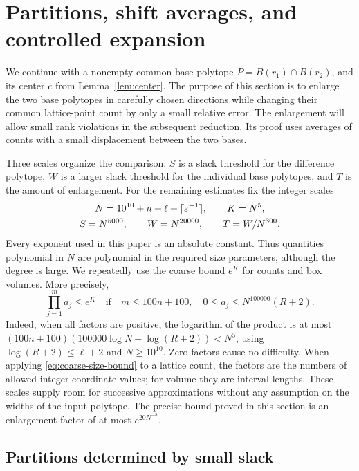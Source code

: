 \section{Partitions, shift averages, and controlled expansion}
\label{sec:geometry}

We continue with a nonempty common-base polytope
\(P=B(r_1)\cap B(r_2)\), and its center \(c\) from
Lemma~\ref{lem:center}.
The purpose of this section is to enlarge the two base polytopes in
carefully chosen directions while changing their common lattice-point
count by only a small relative error.  The enlargement will allow
small rank violations in the subsequent reduction.  Its proof uses
averages of counts with a small displacement between the two bases.

Three scales organize the comparison: \(S\) is a slack threshold for
the difference polytope, \(W\) is a larger slack threshold for the
individual base polytopes, and \(T\) is the amount of enlargement.
For the remaining estimates fix the integer scales
\begin{equation}\label{eq:scales}
 \begin{gathered}
 N=10^{10}+n+\ell+\lceil\varepsilon^{-1}\rceil,
 \qquad K=N^5,\\
 S=N^{5000},\qquad W=N^{20000},\qquad T=W/N^{300}.
 \end{gathered}
\end{equation}
Every exponent used in this paper is an absolute constant.  Thus
quantities polynomial in $N$ are polynomial in the required size
parameters, although the degree is large.  We repeatedly use the
coarse bound $e^K$ for counts and box volumes.  More precisely,
\begin{equation}\label{eq:coarse-size-bound}
 \prod_{j=1}^m a_j\leq e^K
 \quad\text{if}\quad
 m\leq100n+100,\quad 0\leq a_j\leq N^{100000}(R+2).
\end{equation}
Indeed, when all factors are positive, the logarithm of the product
is at most
$(100n+100)(100000\log N+\log(R+2))<N^5$,
using $\log(R+2)\leq\ell+2$ and $N\geq10^{10}$.
Zero factors cause no difficulty.  When applying
\eqref{eq:coarse-size-bound} to a lattice count, the factors are the
numbers of allowed integer coordinate values; for volume they are
interval lengths.  These scales supply room for successive
approximations without any assumption on the widths of the input
polytope.  The precise bound proved in this section is an enlargement
factor of at most \(e^{20N^{-8}}\).

\subsection{Partitions determined by small slack}

